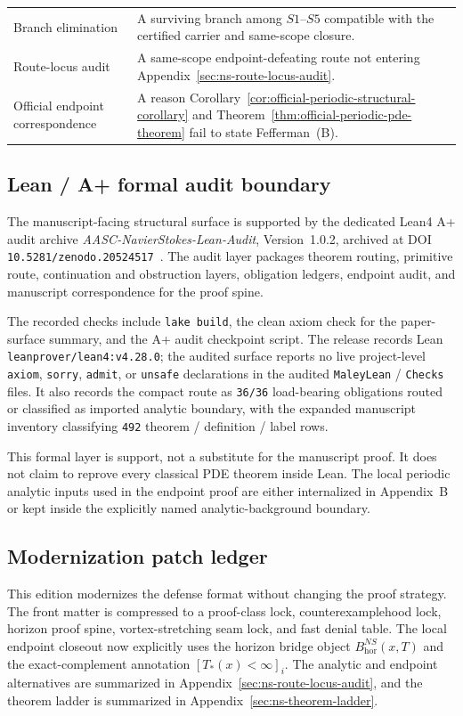 \begin{center}
\begin{tabularx}{0.98\textwidth}{@{}L{0.31\textwidth}Y@{}}
Branch elimination & A surviving branch among $S1$--$S5$ compatible with the certified carrier and same-scope closure.\\
Route-locus audit & A same-scope endpoint-defeating route not entering Appendix~\ref{sec:ns-route-locus-audit}.\\
Official endpoint correspondence & A reason Corollary~\ref{cor:official-periodic-structural-corollary} and Theorem~\ref{thm:official-periodic-pde-theorem} fail to state Fefferman~(B).\\
\bottomrule
\end{tabularx}
\end{center}

\subsection{Lean / A+ formal audit boundary}\label{sec:lean-audit-boundary-modernized}
The manuscript-facing structural surface is supported by the dedicated Lean4 A+ audit archive \emph{AASC-NavierStokes-Lean-Audit}, Version~1.0.2, archived at DOI \texttt{10.5281/zenodo.20524517}~\cite{maley-navierstokes-lean-audit}. The audit layer packages theorem routing, primitive route, continuation and obstruction layers, obligation ledgers, endpoint audit, and manuscript correspondence for the proof spine.

The recorded checks include \texttt{lake build}, the clean axiom check for the paper-surface summary, and the A+ audit checkpoint script. The release records Lean \texttt{leanprover/lean4:v4.28.0}; the audited surface reports no live project-level \texttt{axiom}, \texttt{sorry}, \texttt{admit}, or \texttt{unsafe} declarations in the audited \texttt{MaleyLean} / \texttt{Checks} files. It also records the compact route as \texttt{36/36} load-bearing obligations routed or classified as imported analytic boundary, with the expanded manuscript inventory classifying \texttt{492} theorem / definition / label rows.

This formal layer is support, not a substitute for the manuscript proof. It does not claim to reprove every classical PDE theorem inside Lean. The local periodic analytic inputs used in the endpoint proof are either internalized in Appendix~B or kept inside the explicitly named analytic-background boundary.

\subsection{Modernization patch ledger}\label{sec:modernization-patch-ledger}
This edition modernizes the defense format without changing the proof strategy. The front matter is compressed to a proof-class lock, counterexamplehood lock, horizon proof spine, vortex-stretching seam lock, and fast denial table. The local endpoint closeout now explicitly uses the horizon bridge object $B^{NS}_{\mathrm{hor}}(x,T)$ and the exact-complement annotation $[T_*(x)<\infty]_i$. The analytic and endpoint alternatives are summarized in Appendix~\ref{sec:ns-route-locus-audit}, and the theorem ladder is summarized in Appendix~\ref{sec:ns-theorem-ladder}.
